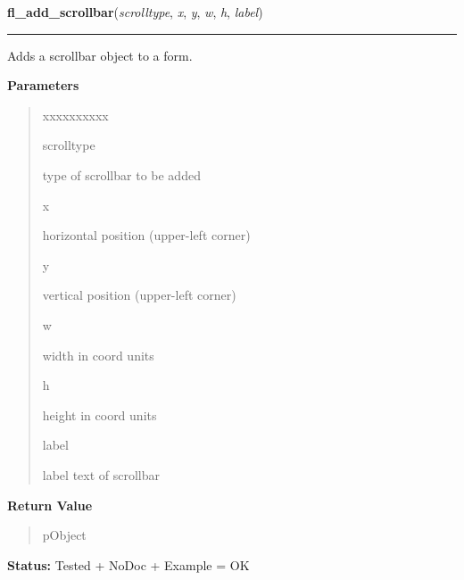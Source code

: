 \hspace{.8\funcindent}\begin{boxedminipage}{\funcwidth}

    \raggedright \textbf{fl\_add\_scrollbar}(\textit{scrolltype}, \textit{x}, \textit{y}, \textit{w}, \textit{h}, \textit{label})

    \vspace{-1.5ex}

    \rule{\textwidth}{0.5\fboxrule}
\setlength{\parskip}{2ex}
    Adds a scrollbar object to a form.

\setlength{\parskip}{1ex}
      \textbf{Parameters}
      \vspace{-1ex}

      \begin{quote}
        \begin{Ventry}{xxxxxxxxxx}

          \item[scrolltype]

          type of scrollbar to be added

          \item[x]

          horizontal position (upper-left corner)

          \item[y]

          vertical position (upper-left corner)

          \item[w]

          width in coord units

          \item[h]

          height in coord units

          \item[label]

          label text of scrollbar

        \end{Ventry}

      \end{quote}

      \textbf{Return Value}
    \vspace{-1ex}

      \begin{quote}
      pObject

      \end{quote}

\textbf{Status:} Tested + NoDoc + Example = OK



    \end{boxedminipage}


